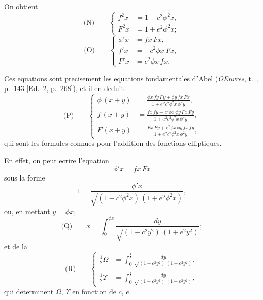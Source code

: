 \documentclass[11pt,a4paper]{article}
\begin{document}
On obtient
\begin{equation*}
\text{(N)}\qquad
\left\{
\begin{aligned}
f^2x &= 1 - c^2 \phi^2 x,\\
F^2x &= 1 + e^2 \phi^2 x;
\end{aligned}
\right.
\end{equation*}
\begin{equation*}
\text{(O)}\qquad
\left\{
\begin{aligned}
\phi' x &= fx\, Fx,\\
f' x &= -c^2 \phi x\, Fx,\\
F' x &= e^2 \phi x\, fx.
\end{aligned}
\right.
\end{equation*}

Ces equations sont precisement les equations fondamentales d'Abel (\textit{OEuvres}, t.\textsc{i}., p.~143
[Ed.~2, p.~268]), et il en deduit
\begin{equation*}
\text{(P)}\qquad
\left\{
\begin{aligned}
\phi\, (x+y) &= \frac{\phi x\, fy\, Fy + \phi y\, fx\, Fx}{1 + e^2 c^2 \phi^2 x\, \phi^2 y},\\
f\, (x+y) &= \frac{fx\, fy - c^2 \phi x\, \phi y\, Fx\, Fy}{1 + e^2 c^2 \phi^2 x\, \phi^2 y},\\
F\, (x+y) &= \frac{Fx\, Fy + e^2 \phi x\, \phi y\, fx\, fy}{1 + e^2 c^2 \phi^2 x\, \phi^2 y},
\end{aligned}
\right.
\end{equation*}
qui sont les formules connues pour l'addition des fonctions elliptiques.

En effet, on peut ecrire l'equation
\[\phi' x = fx\, Fx\]
sous la forme
\[1 = \frac{\phi' x}{\sqrt{(1 - c^2 \phi^2 x)\, (1 + e^2 \phi^2 x)}},\]
ou, en mettant $y = \phi x$,
\begin{equation*}
\text{(Q)}\qquad x = \int_0^{\phi x} \frac{dy}{\sqrt{(1 - c^2 y^2)\, (1 + e^2 y^2)}};
\end{equation*}
et de la
\begin{equation*}
\text{(R)}\qquad
\left\{
\begin{aligned}
\tfrac{1}{2}\Omega &= \int_0^{\frac{1}{c}} \frac{dy}{\sqrt{(1 - c^2 y^2)\, (1 + e^2 y^2)}},\\
\tfrac{1}{2}\Upsilon &= \int_0^{\frac{i}{e}} \frac{dy}{\sqrt{(1 - c^2 y^2)\, (1 + e^2 y^2)}},
\end{aligned}
\right.
\end{equation*}
qui determinent $\Omega$, $\Upsilon$ en fonction de $c$, $e$.
\end{document}

